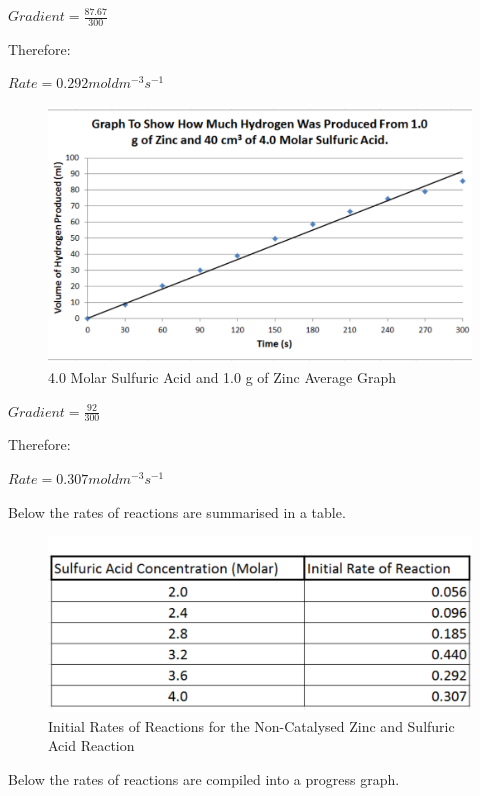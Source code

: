 $Gradient = \frac{87.67}{300}$

Therefore:

$Rate = 0.292 mol dm^{-3} s^{-1}$

\begin{figure}[H]
    \includegraphics[width=\textwidth]{./Analysis/Images/1NonCatalyst/40Molar.pdf}
    \caption{4.0 Molar Sulfuric Acid and 1.0 g of Zinc Average Graph} \label{fig:40MolarSAGradient}
\end{figure}

$Gradient = \frac{92}{300}$

Therefore:

$Rate = 0.307 mol dm^{-3} s^{-1}$

Below the rates of reactions are summarised in a table.

\begin{figure}[H]
    \includegraphics[width=\textwidth]{./Analysis/Images/1NonCatalyst/Rates.pdf}
    \caption{Initial Rates of Reactions for the Non-Catalysed Zinc and Sulfuric Acid Reaction} \label{fig:RatesSA}
\end{figure}

Below the rates of reactions are compiled into a progress graph.

